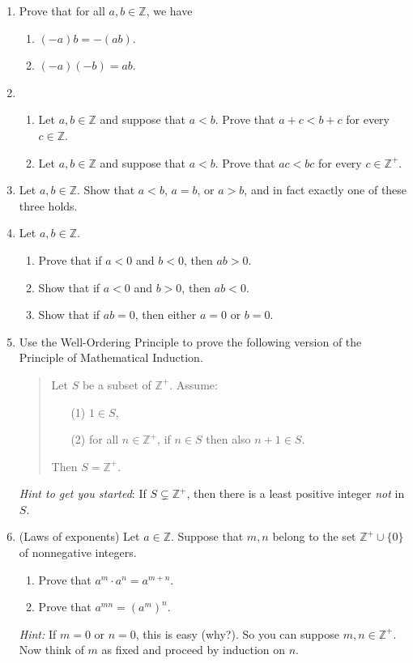 \documentclass[11pt]{article}
\def\Z{\mathbb{Z}}
\theoremstyle{plain}
\theoremstyle{remark}
\begin{document}
\begin{enumerate}
\item Prove that for all $a, b \in \Z$, we have
\begin{enumerate}
\item $(-a)b = - (ab)$.
\item $(-a)(-b) = ab$.
\end{enumerate}

\item 
\begin{enumerate}
\item Let $a, b \in \Z$ and suppose that $a < b$. Prove that $a+c < b+c$ for every $c \in \Z$.
\item Let $a, b \in \Z$ and suppose that $a < b$. Prove that $ac < bc$ for every $c \in \Z^{+}$.
\end{enumerate}

\item Let $a, b \in \Z$. Show that $a< b$, $a=b$, or $a>b$, and in fact exactly one of these three holds.

\item Let $a, b \in \Z$.
\begin{enumerate}
 \item Prove that if $a < 0$ and $b < 0$, then $ab > 0$.
 \item Show that if $a < 0$ and $b > 0$, then $ab < 0$.
 \item Show that if $ab=0$, then either $a=0$ or $b=0$.
\end{enumerate}

\item Use the Well-Ordering  Principle to prove the following version of the Principle of Mathematical Induction.

\begin{quote}Let $S$ be a subset of $\Z^{+}$. Assume:
\begin{enumerate}\item[(1)] $1 \in S$, \item[(2)] for all $n \in \Z^{+}$, if $n\in S$ then also $n+1 \in S$. \end{enumerate}
Then $S = \mathbb{Z}^{+}$.\end{quote}

{\scriptsize \emph{Hint to get you started}: If $S \subsetneq \Z^{+}$, then there is a least positive integer \emph{not} in $S$.}


\item (Laws of exponents) Let $a \in \Z$. Suppose that $m, n$ belong to the set $\Z^{+}\cup\{0\}$ of nonnegative integers.
\begin{enumerate}
 \item Prove that $a^m \cdot a^n = a^{m+n}$.
 \item Prove that $a^{mn} = (a^{m})^n$.
\end{enumerate}
{\scriptsize \emph{Hint:} If $m=0$ or $n=0$, this is easy (why?). So you can suppose $m, n \in \Z^{+}$. Now think of $m$ as fixed and proceed by induction on $n$.}



\end{enumerate}
\end{document}

